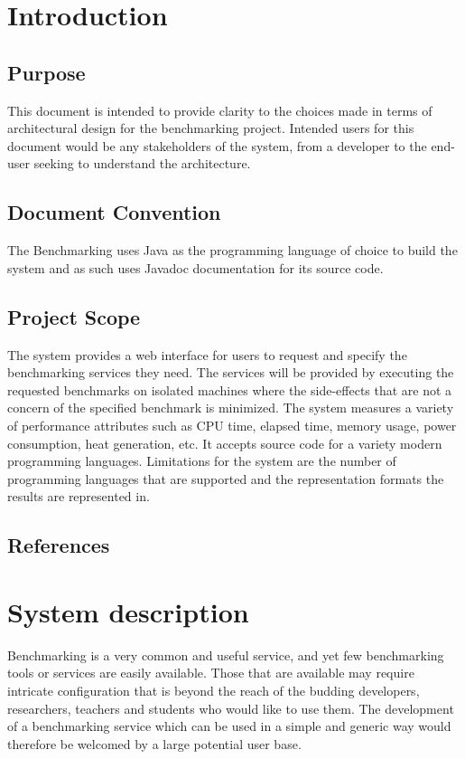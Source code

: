\documentclass[runningheads,a4paper]{article}
\begin{document}
\section{Introduction}

\subsection{Purpose}
This document is intended to provide clarity to the choices made in terms of architectural design for the benchmarking project. Intended users for this document would be any stakeholders of the system, from a developer to the end-user seeking to understand the architecture.

\subsection{Document Convention}
The Benchmarking uses Java as the programming language of choice to build the system and as such uses Javadoc documentation for its source code.

\subsection{Project Scope}
The system provides a web interface for users to request and specify the benchmarking services they need. The services will be provided by executing the requested benchmarks on isolated machines where the side-effects that are not a concern of the specified benchmark is minimized. The system measures a variety of performance attributes such as CPU time, elapsed time, memory usage, power consumption, heat generation, etc. It accepts source code for a variety modern programming languages. Limitations for the system are the number of programming languages that are supported and the representation formats the results are represented in.

\subsection{References}



\section{System description}
Benchmarking is a very common and useful service, and yet few benchmarking tools or services are easily available. Those that are available may require intricate configuration that is beyond the reach of the budding developers, researchers, teachers and students who would like to use them. The development of a benchmarking service which can be used in a simple and generic way would therefore be welcomed by a large potential user base.
\end{document}
